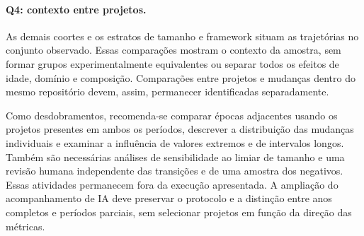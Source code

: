\paragraph{Q4: contexto entre projetos.}
As demais coortes e os estratos de tamanho e framework situam as trajetórias no conjunto observado. Essas comparações mostram o contexto da amostra, sem formar grupos experimentalmente equivalentes ou separar todos os efeitos de idade, domínio e composição. Comparações entre projetos e mudanças dentro do mesmo repositório devem, assim, permanecer identificadas separadamente.

Como desdobramentos, recomenda-se comparar épocas adjacentes usando os projetos presentes em ambos os períodos, descrever a distribuição das mudanças individuais e examinar a influência de valores extremos e de intervalos longos. Também são necessárias análises de sensibilidade ao limiar de tamanho e uma revisão humana independente das transições e de uma amostra dos negativos. Essas atividades permanecem fora da execução apresentada. A ampliação do acompanhamento de IA deve preservar o protocolo e a distinção entre anos completos e períodos parciais, sem selecionar projetos em função da direção das métricas.
